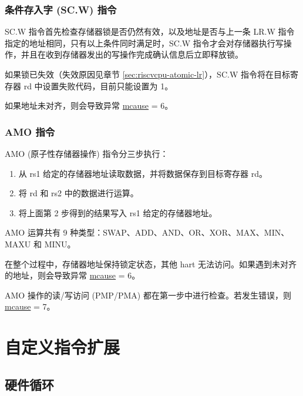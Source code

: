 \documentclass[main\_\_CN.tex]{subfiles}
\begin{document}
\subsubsection{条件存入字 (SC.W) 指令}
\label{sec:riscvcpu-atomic-sc}

SC.W 指令首先检查存储器锁是否仍然有效，以及地址是否与上一条 LR.W 指令指定的地址相同，只有以上条件同时满足时，SC.W 指令才会对存储器执行写操作，并且在收到存储器发出的写操作完成确认信息后立即释放锁。

如果锁已失效（失效原因见章节 \ref{sec:riscvcpu-atomic-lr}），SC.W 指令将在目标寄存器 rd 中设置失败代码，目前只能设置为 1。

如果地址未对齐，则会导致异常 \hyperref[regdesc:MCAUSE]{mcause} = 6。

\subsubsection{AMO 指令}
\label{sec:riscvcpu-atomic-amo}

AMO (原子性存储器操作) 指令分三步执行：

\begin{enumerate}
    \item 从 rs1 给定的存储器地址读取数据，并将数据保存到目标寄存器 rd。
    \item 将 rd 和 rs2 中的数据进行运算。
    \item 将上面第 2 步得到的结果写入 rs1 给定的存储器地址。
\end{enumerate}

AMO 运算共有 9 种类型：SWAP、ADD、AND、OR、XOR、MAX、MIN、MAXU 和 MINU。

在整个过程中，存储器地址保持锁定状态，其他 hart 无法访问。如果遇到未对齐的地址，则会导致异常 \hyperref[regdesc:MCAUSE]{mcause} = 6。

AMO 操作的读/写访问 (PMP/PMA) 都在第一步中进行检查。若发生错误，则 \hyperref[regdesc:MCAUSE]{mcause} = 7。

\newpage
\section{自定义指令扩展}

\subsection{硬件循环}
\label{sec:riscvcpu-hwloop}
\end{document}
